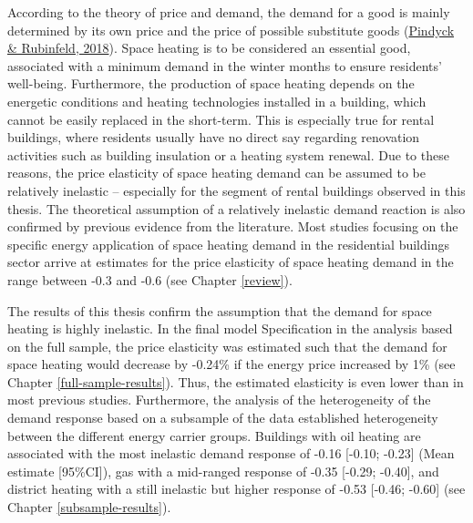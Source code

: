 \documentclass[12pt,twoside]{reedthesis}
\begin{document}
According to the theory of price and demand, the demand for a good is mainly determined by its own price and the price of possible substitute goods (\protect\hyperlink{ref-pindyck_rubinfeld18}{Pindyck \& Rubinfeld, 2018}). Space heating is to be considered an essential good, associated with a minimum demand in the winter months to ensure residents' well-being. Furthermore, the production of space heating depends on the energetic conditions and heating technologies installed in a building, which cannot be easily replaced in the short-term. This is especially true for rental buildings, where residents usually have no direct say regarding renovation activities such as building insulation or a heating system renewal. Due to these reasons, the price elasticity of space heating demand can be assumed to be relatively inelastic -- especially for the segment of rental buildings observed in this thesis. The theoretical assumption of a relatively inelastic demand reaction is also confirmed by previous evidence from the literature. Most studies focusing on the specific energy application of space heating demand in the residential buildings sector arrive at estimates for the price elasticity of space heating demand in the range between -0.3 and -0.6 (see Chapter \ref{review}).

The results of this thesis confirm the assumption that the demand for space heating is highly inelastic. In the final model Specification in the analysis based on the full sample, the price elasticity was estimated such that the demand for space heating would decrease by -0.24\% if the energy price increased by 1\% (see Chapter \ref{full-sample-results}). Thus, the estimated elasticity is even lower than in most previous studies. Furthermore, the analysis of the heterogeneity of the demand response based on a subsample of the data established heterogeneity between the different energy carrier groups. Buildings with oil heating are associated with the most inelastic demand response of -0.16 {[}-0.10; -0.23{]} (Mean estimate {[}95\%CI{]}), gas with a mid-ranged response of -0.35 {[}-0.29; -0.40{]}, and district heating with a still inelastic but higher response of -0.53 {[}-0.46; -0.60{]} (see Chapter \ref{subsample-results}).
\end{document}
